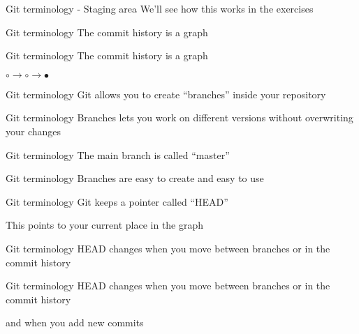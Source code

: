 \documentclass{beamer}
\begin{document}
\begin{frame}{Git terminology - Staging area}
  \center
  \Huge We'll see how this works in the exercises
\end{frame}

\begin{frame}{Git terminology}
  \center
  \Huge The commit history is a graph
\end{frame}

\begin{frame}{Git terminology}
  \center
  \Huge The commit history is a graph

  \Large $ \circ \rightarrow \circ \rightarrow \bullet $
\end{frame}

\begin{frame}{Git terminology}
  \center
  \Huge Git allows you to create ``branches'' inside your repository
\end{frame}

\begin{frame}{Git terminology}
  \center
  \Huge Branches lets you work on different versions without overwriting your changes
\end{frame}

\begin{frame}{Git terminology}
  \center
  \Huge The main branch is called ``master''
\end{frame}

\begin{frame}{Git terminology}
  \center
  \Huge Branches are easy to create and easy to use
\end{frame}

\begin{frame}{Git terminology}
  \center
  \Huge Git keeps a pointer called ``HEAD''

  \Large This points to your current place in the graph
\end{frame}

\begin{frame}{Git terminology}
  \center
  \Huge HEAD changes when you move between branches or in the commit history
\end{frame}

\begin{frame}{Git terminology}
  \center
  \Huge HEAD changes when you move between branches or in the commit history

  \huge and when you add new commits
\end{frame}
\end{document}
